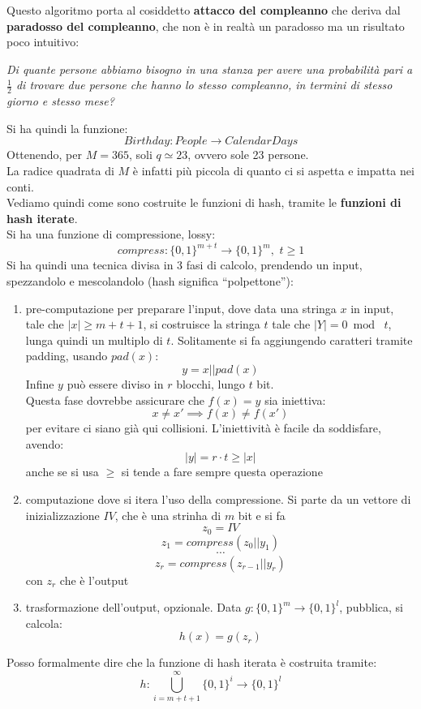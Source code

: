 \documentclass[a4paper,12pt, oneside]{book}
\begin{document}
Questo algoritmo porta al cosiddetto \textbf{attacco del compleanno} che deriva
dal \textbf{paradosso del compleanno}, che non è in realtà un paradosso ma un
risultato poco intuitivo:
\begin{center}
  \textit{Di quante persone abbiamo bisogno in una stanza per avere una
    probabilità pari a $\frac{1}{2}$ di trovare due persone che hanno lo stesso
    compleanno, in termini di stesso giorno e stesso mese?} 
\end{center}
Si ha quindi la funzione:
\[Birthday:People\to CalendarDays\]
Ottenendo, per $M=365$, soli $q\simeq 23$, ovvero sole 23 persone.\\
La radice quadrata di $M$ è infatti più piccola di quanto ci si aspetta e
impatta nei conti.\\
Vediamo quindi come sono costruite le funzioni di hash, tramite le
\textbf{funzioni di hash iterate}.\\
Si ha una funzione di compressione, lossy:
\[compress:\{0,1\}^{m+t}\to\{0,1\}^{m},\,\,t\geq 1\]
Si ha quindi una tecnica divisa in 3 fasi di calcolo, prendendo un input,
spezzandolo e mescolandolo (hash significa ``polpettone''):
\begin{enumerate}
  \item pre-computazione per preparare l'input, dove data una stringa $x$ in
  input, tale che $|x|\geq m+t+1$, si costruisce la stringa $t$ tale che
  $|Y|=0\bmod \,\,t$, lunga quindi un multiplo di $t$. Solitamente si fa
  aggiungendo caratteri tramite padding, usando $pad(x)$:
  \[y=x||pad(x)\]
  Infine $y$ può essere diviso in $r$ blocchi, lungo $t$ bit.\\
  Questa fase dovrebbe assicurare che $f(x)=y$ sia iniettiva:
  \[x\neq x'\implies f(x)\neq f(x')\]
  per evitare ci siano già qui collisioni. L'iniettività è facile da soddisfare,
  avendo:
  \[|y|=r\cdot t\geq |x|\]
  anche se si usa $\geq$ si tende a fare sempre questa operazione
  \item computazione dove si itera l'uso della compressione. Si parte da un
  vettore di inizializzazione $IV$, che è una strinha di $m$ bit e si fa
  \[z_0=IV\]
  \[z_1=compress(z_0||y_1)\]
  \[\cdots\]
  \[z_r=compress(z_{r-1}||y_r) \]
  con $z_r$ che è l'output
  \item trasformazione dell'output, opzionale. Data $g:\{0,1\}^m\to\{0,1\}^l$,
  pubblica, si calcola:
  \[h(x)=g(z_r)\]
\end{enumerate}
Posso formalmente dire che la funzione di hash iterata è costruita tramite:
\[h:\bigcup_{i=m+t+1}^\infty\{0,1\}^i\to\{0,1\}^l\]
\end{document}
